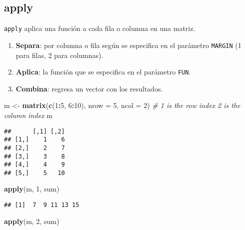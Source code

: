 \documentclass[]{article}
\newenvironment{Shaded}{\begin{snugshade}}{\end{snugshade}}
\newcommand{\KeywordTok}[1]{\textcolor[rgb]{0.13,0.29,0.53}{\textbf{#1}}}
\newcommand{\DataTypeTok}[1]{\textcolor[rgb]{0.13,0.29,0.53}{#1}}
\newcommand{\DecValTok}[1]{\textcolor[rgb]{0.00,0.00,0.81}{#1}}
\newcommand{\StringTok}[1]{\textcolor[rgb]{0.31,0.60,0.02}{#1}}
\newcommand{\CommentTok}[1]{\textcolor[rgb]{0.56,0.35,0.01}{\textit{#1}}}
\newcommand{\OperatorTok}[1]{\textcolor[rgb]{0.81,0.36,0.00}{\textbf{#1}}}
\newcommand{\NormalTok}[1]{#1}
\providecommand{\tightlist}{%
  \setlength{\itemsep}{0pt}\setlength{\parskip}{0pt}}
\begin{document}
\subsection{apply}\label{apply}

\texttt{apply} aplica una función a cada fila o columna en una matriz.

\begin{enumerate}
\def\labelenumi{\arabic{enumi}.}
\tightlist
\item
  \textbf{Separa}: por columna o fila según se especifica en el
  parámetro \texttt{MARGIN} (1 para filas, 2 para columnas).
\item
  \textbf{Aplica}: la función que se especifica en el parámetro
  \texttt{FUN}.
\item
  \textbf{Combina}: regresa un vector con los resultados.
\end{enumerate}

\begin{Shaded}
\begin{Highlighting}[]
\NormalTok{m <-}\StringTok{ }\KeywordTok{matrix}\NormalTok{(}\KeywordTok{c}\NormalTok{(}\DecValTok{1}\OperatorTok{:}\DecValTok{5}\NormalTok{, }\DecValTok{6}\OperatorTok{:}\DecValTok{10}\NormalTok{), }\DataTypeTok{nrow =} \DecValTok{5}\NormalTok{, }\DataTypeTok{ncol =} \DecValTok{2}\NormalTok{)}
\CommentTok{# 1 is the row index 2 is the column index}
\NormalTok{m}
\end{Highlighting}
\end{Shaded}

\begin{verbatim}
##      [,1] [,2]
## [1,]    1    6
## [2,]    2    7
## [3,]    3    8
## [4,]    4    9
## [5,]    5   10
\end{verbatim}

\begin{Shaded}
\begin{Highlighting}[]
\KeywordTok{apply}\NormalTok{(m, }\DecValTok{1}\NormalTok{, sum)}
\end{Highlighting}
\end{Shaded}

\begin{verbatim}
## [1]  7  9 11 13 15
\end{verbatim}

\begin{Shaded}
\begin{Highlighting}[]
\KeywordTok{apply}\NormalTok{(m, }\DecValTok{2}\NormalTok{, sum)}
\end{Highlighting}
\end{Shaded}
\end{document}
